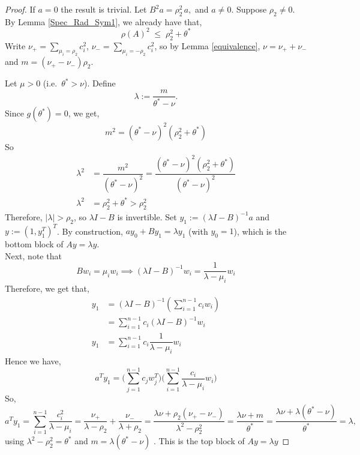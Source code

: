 \documentclass[12pt]{article}
\theoremstyle{plain}
\numberwithin{equation}{section}
\begin{document}
	\begin{proof}
		If $a=0$ the result is trivial. Let  $B^2a=\rho_2^2\,a,$ and $a \neq 0$. Suppose $\rho_2 \neq 0$. By Lemma \ref{Spec_Rad_Sym1}, we already have that,
		\begin{equation}\label{eq:JZZ}
			\rho(A)^2 \;\le\; \rho_2^2+\theta^*
		\end{equation}
		Write $\nu_+=\sum_{\mu_i=\rho_2}c_i^2$, \quad
		$\nu_-=\sum_{\mu_i=-\rho_2}c_i^2$, so by Lemma \ref{equivalence}, $\nu=\nu_++\nu_-$ and
		$m=(\nu_+-\nu_-)\rho_2$.
		
		\smallskip
		Let $\mu > 0$ (i.e.\ $\theta^*>\nu$). Define
		\[
		\lambda:=\frac{m}{\theta^*-\nu}.
		\]
		Since $g(\theta^*)=0$, we get, $$m^2=(\theta^*-\nu)^2(\rho_2^2+\theta^*)$$ So
		\begin{align*}
			\lambda^2&=\dfrac{m^2}{(\theta^*-\nu)^2}=\dfrac{(\theta^*-\nu)^2(\rho_2^2+\theta^*)}{(\theta^*-\nu)^2}\\
			\lambda^2&=\rho_2^2+\theta^*>\rho_2^2
		\end{align*}
		Therefore, $|\lambda|>\rho_2$, so
		$\lambda I-B$ is invertible. 
		\newline
		Set $y_1:=(\lambda I-B)^{-1}a$ and
		$y:=(1, y_1^T)^T$. By construction, $ay_0+By_1=\lambda y_1$ (with $y_0=1$), which is
		the bottom block of $Ay=\lambda y$. \\
		Next, note that \\
		$$
		Bw_i=\mu_iw_i \implies (\lambda I-B)^{-1}
		w_i=\dfrac{1}{\lambda-\mu_i}w_i$$
		Therefore, we get that,
		\begin{align*}
			y_1&= (\lambda I-B)^{-1}(\sum_{i=1}^{n-1}c_iw_i)\\
			&= \sum_{i=1}^{n-1}c_i(\lambda I-B)^{-1}w_i\\
			y_1&= \sum_{i=1}^{n-1}c_i\dfrac{1}{\lambda-\mu_i}w_i
		\end{align*}
		Hence we have,
		\begin{equation}
			a^Ty_1= \bigg(\sum_{j=1}^{n-1}c_jw_j^T\bigg)\bigg(\sum_{i=1}^{n-1}\dfrac{c_i}{\lambda-\mu_i}w_i\bigg)
		\end{equation}
		So,
		\[
		a^Ty_1=\sum \limits_{i=1}^{n-1} \frac{c_i^2}{\lambda-\mu_i}
		=\frac{\nu_+}{\lambda-\rho_2}+\frac{\nu_-}{\lambda+\rho_2}
		=\frac{\lambda\nu+\rho_2(\nu_+-\nu_-)}{\lambda^2-\rho_2^2}
		=\frac{\lambda\nu+m}{\theta^*}
		=\frac{\lambda\nu+\lambda(\theta^*-\nu)}{\theta^*}=\lambda,
		\]
		using $\lambda^2-\rho_2^2=\theta^*$ and $m=\lambda(\theta^*-\nu)$ . This is the top block of $Ay=\lambda y$
		\medskip
		

\end{proof}
\end{document}
